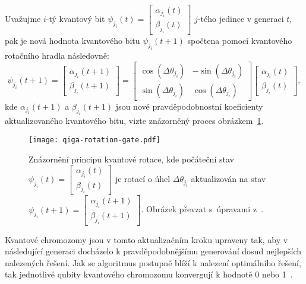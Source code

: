 Uvažujme $i$-tý kvantový bit $\psi_{j_i}\left(t\right) = \begin{bmatrix} \alpha_{j_i}\left(t\right) \\ \beta_{j_i}\left(t\right) \end{bmatrix}$ $j$-tého jedince v generaci $t$, pak je nová hodnota kvantového bitu $\psi_{j_i}\left(t+1\right)$ spočtena pomocí kvantového rotačního hradla následovně:
\begin{equation*}\label{eq:qiga-rotation-gate-angles}
    \psi_{j_i}\left(t+1\right) =
    \begin{bmatrix}
        \alpha_{j_i}\left(t+1\right) \\
        \beta_{j_i}\left(t+1\right)
    \end{bmatrix}
    =
    \begin{bmatrix}
        \cos{\left( \Delta\theta_{j_i} \right)} & - \sin{\left( \Delta\theta_{j_i} \right)} \\
        \sin{\left( \Delta\theta_{j_i} \right)} &   \cos{\left( \Delta\theta_{j_i} \right)}
    \end{bmatrix}
    \begin{bmatrix}
        \alpha_{j_i}\left(t\right) \\
        \beta_{j_i}\left(t\right) 
    \end{bmatrix},
\end{equation*}
kde $\alpha_{j_i}\left(t+1\right)$ a $\beta_{j_i}\left(t+1\right)$ jsou nové pravděpodobnostní koeficienty aktualizovaného kvantového bitu, vizte znázorněný proces obrázkem~\ref{fig:qiga-rotation-gate}.

\begin{figure}[ht!]
    \centering
    \texttt{[image: qiga-rotation-gate.pdf]}
    \caption{Znázornění principu kvantové rotace, kde počáteční stav $\psi_{j_i}\left(t\right) = \begin{bmatrix} \alpha_{j_i}\left(t\right) \\ \beta_{j_i}\left(t\right) \end{bmatrix}$ je rotací o úhel $\Delta\theta_{j_i}$ aktualizován na stav $\psi_{j_i}\left(t+1\right) = \begin{bmatrix} \alpha_{j_i}\left(t+1\right) \\ \beta_{j_i}\left(t+1\right) \end{bmatrix}$. Obrázek převzat s~úpravami z~\cite{qisa}.}
    \label{fig:qiga-rotation-gate}
\end{figure}

Kvantové chromozomy jsou v tomto aktualizačním kroku upraveny tak, aby v následující generaci docházelo k pravděpodobnějšímu generování dosud nejlepších nalezených řešení. 
Jak se algoritmus postupně blíží k nalezení optimálního řešení, tak jednotlivé qubity kvantového chromozomu konvergují k hodnotě 0 nebo 1~\cite{NaturalComputing,qiga}.

